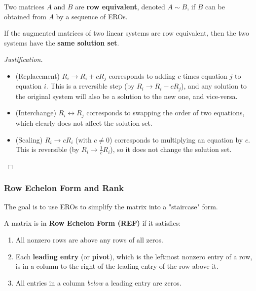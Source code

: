 \begin{definition}
Two matrices $A$ and $B$ are \textbf{row equivalent}, denoted $A \sim B$, if $B$ can be obtained from $A$ by a sequence of EROs.
\end{definition}

\begin{theorem}
If the augmented matrices of two linear systems are row equivalent, then the two systems have the \textbf{same solution set}.
\end{theorem}
\begin{proof}[Justification]
\begin{itemize}
    \item (Replacement) $R_i \to R_i + cR_j$ corresponds to adding $c$ times equation $j$ to equation $i$. This is a reversible step (by $R_i \to R_i - cR_j$), and any solution to the original system will also be a solution to the new one, and vice-versa.
    \item (Interchange) $R_i \leftrightarrow R_j$ corresponds to swapping the order of two equations, which clearly does not affect the solution set.
    \item (Scaling) $R_i \to cR_i$ (with $c \neq 0$) corresponds to multiplying an equation by $c$. This is reversible (by $R_i \to \frac{1}{c}R_i$), so it does not change the solution set.
\end{itemize}
\end{proof}

\subsubsection{Row Echelon Form and Rank}

The goal is to use EROs to simplify the matrix into a "staircase" form.

\begin{definition}
A matrix is in \textbf{Row Echelon Form (REF)} if it satisfies:
\begin{enumerate}
    \item All nonzero rows are above any rows of all zeros.
    \item Each \textbf{leading entry} (or \textbf{pivot}), which is the leftmost nonzero entry of a row, is in a column to the right of the leading entry of the row above it.
    \item All entries in a column \emph{below} a leading entry are zeros.
\end{enumerate}
\end{definition}

